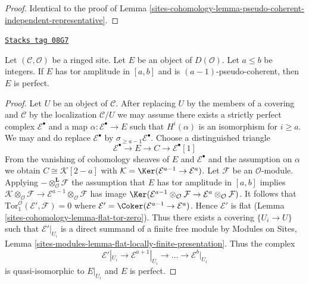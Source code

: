 \begin{proof}
Identical to the proof of
Lemma \ref{sites-cohomology-lemma-pseudo-coherent-independent-representative}.
\end{proof}

\begin{lemma}
\label{sites-cohomology-lemma-perfect-precise}
\href{https://stacks.math.columbia.edu/tag/08G7}{\texttt{Stacks tag 08G7}}

Let $(\mathcal{C}, \mathcal{O})$ be a ringed site.
Let $E$ be an object of $D(\mathcal{O})$.
Let $a \leq b$ be integers. If $E$ has tor amplitude in $[a, b]$
and is $(a - 1)$-pseudo-coherent, then $E$ is perfect.
\end{lemma}

\begin{proof}
Let $U$ be an object of $\mathcal{C}$. After replacing $U$ by the members
of a covering and $\mathcal{C}$ by the localization $\mathcal{C}/U$
we may assume there exists a strictly perfect complex $\mathcal{E}^\bullet$
and a map $\alpha : \mathcal{E}^\bullet \to E$ such that $H^i(\alpha)$ is
an isomorphism for $i \geq a$. We may and do replace
$\mathcal{E}^\bullet$ by $\sigma_{\geq a - 1}\mathcal{E}^\bullet$. Choose a
distinguished triangle
$$
\mathcal{E}^\bullet \to E \to C \to \mathcal{E}^\bullet[1]
$$
From the vanishing of cohomology sheaves of $E$ and $\mathcal{E}^\bullet$
and the assumption on $\alpha$ we obtain $C \cong \mathcal{K}[2 - a]$ with
$\mathcal{K} = \Ker(\mathcal{E}^{a - 1} \to \mathcal{E}^a)$.
Let $\mathcal{F}$ be an $\mathcal{O}$-module.
Applying $- \otimes_\mathcal{O}^\mathbf{L} \mathcal{F}$
the assumption that $E$ has tor amplitude in $[a, b]$
implies $\mathcal{K} \otimes_\mathcal{O} \mathcal{F} \to
\mathcal{E}^{a - 1} \otimes_\mathcal{O} \mathcal{F}$ has image
$\Ker(\mathcal{E}^{a - 1} \otimes_\mathcal{O} \mathcal{F}
\to \mathcal{E}^a \otimes_\mathcal{O} \mathcal{F})$.
It follows that $\text{Tor}_1^\mathcal{O}(\mathcal{E}', \mathcal{F}) = 0$
where $\mathcal{E}' = \Coker(\mathcal{E}^{a - 1} \to \mathcal{E}^a)$.
Hence $\mathcal{E}'$ is flat (Lemma \ref{sites-cohomology-lemma-flat-tor-zero}).
Thus there exists a covering $\{U_i \to U\}$ such that
$\mathcal{E}'|_{U_i}$ is a direct summand of a finite free module by
Modules on Sites, Lemma
\ref{sites-modules-lemma-flat-locally-finite-presentation}.
Thus the complex
$$
\mathcal{E}'|_{U_i} \to \mathcal{E}^{a + 1}|_{U_i} \to \ldots \to
\mathcal{E}^b|_{U_i}
$$
is quasi-isomorphic to $E|_{U_i}$ and $E$ is perfect.
\end{proof}

